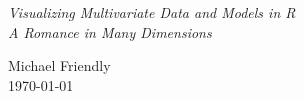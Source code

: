 \bigskip
\begin{center}
\sffamily
\emph{
  \Huge{Visualizing Multivariate Data and Models in R} \\
  \LARGE{A Romance in Many Dimensions}
  }
\end{center}
\bigskip
\bigskip
\bigskip

\begin{center}
Michael Friendly \\
\today
\end{center}

